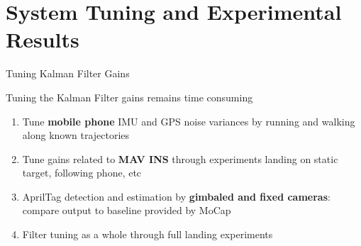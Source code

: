 \section{System Tuning and Experimental Results}

\begin{frame}{Tuning Kalman Filter Gains}

Tuning the Kalman Filter gains remains time consuming
\begin{enumerate}
	\item Tune \textbf{mobile phone} IMU and GPS noise variances by running and walking along known trajectories
	\item Tune gains related to \textbf{MAV INS} through experiments landing on static target, following phone, etc
	\item AprilTag detection and estimation by \textbf{gimbaled and fixed cameras}: 
	compare output to baseline provided by MoCap
	\item Filter tuning as a whole through full landing experiments
\end{enumerate}

\end{frame}





